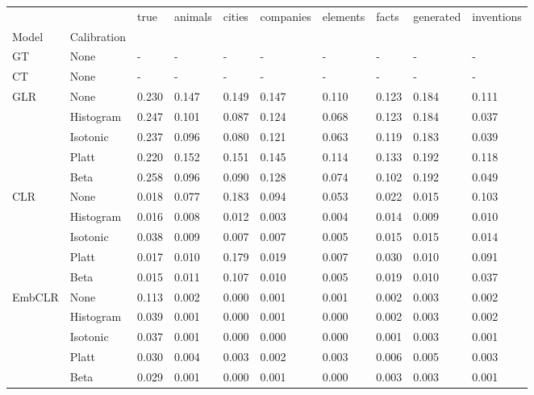 \begin{tabular}{llllllllll}
\toprule
 &  & true & animals & cities & companies & elements & facts & generated & inventions \\
Model & Calibration &  &  &  &  &  &  &  &  \\
\midrule
GT & None & - & - & - & - & - & - & - & - \\
\cline{1-10}
CT & None & - & - & - & - & - & - & - & - \\
\cline{1-10}
\multirow[t]{5}{*}{GLR} & None & 0.230 & 0.147 & 0.149 & 0.147 & 0.110 & 0.123 & 0.184 & 0.111 \\
 & Histogram & 0.247 & 0.101 & 0.087 & 0.124 & 0.068 & 0.123 & 0.184 & 0.037 \\
 & Isotonic & 0.237 & 0.096 & 0.080 & 0.121 & 0.063 & 0.119 & 0.183 & 0.039 \\
 & Platt & 0.220 & 0.152 & 0.151 & 0.145 & 0.114 & 0.133 & 0.192 & 0.118 \\
 & Beta & 0.258 & 0.096 & 0.090 & 0.128 & 0.074 & 0.102 & 0.192 & 0.049 \\
\cline{1-10}
\multirow[t]{5}{*}{CLR} & None & 0.018 & 0.077 & 0.183 & 0.094 & 0.053 & 0.022 & 0.015 & 0.103 \\
 & Histogram & 0.016 & 0.008 & 0.012 & 0.003 & 0.004 & 0.014 & 0.009 & 0.010 \\
 & Isotonic & 0.038 & 0.009 & 0.007 & 0.007 & 0.005 & 0.015 & 0.015 & 0.014 \\
 & Platt & 0.017 & 0.010 & 0.179 & 0.019 & 0.007 & 0.030 & 0.010 & 0.091 \\
 & Beta & 0.015 & 0.011 & 0.107 & 0.010 & 0.005 & 0.019 & 0.010 & 0.037 \\
\cline{1-10}
\multirow[t]{5}{*}{EmbCLR} & None & 0.113 & 0.002 & 0.000 & 0.001 & 0.001 & 0.002 & 0.003 & 0.002 \\
 & Histogram & 0.039 & 0.001 & 0.000 & 0.001 & 0.000 & 0.002 & 0.003 & 0.002 \\
 & Isotonic & 0.037 & 0.001 & 0.000 & 0.000 & 0.000 & 0.001 & 0.003 & 0.001 \\
 & Platt & 0.030 & 0.004 & 0.003 & 0.002 & 0.003 & 0.006 & 0.005 & 0.003 \\
 & Beta & 0.029 & 0.001 & 0.000 & 0.001 & 0.000 & 0.003 & 0.003 & 0.001 \\
\cline{1-10}
\bottomrule
\end{tabular}
